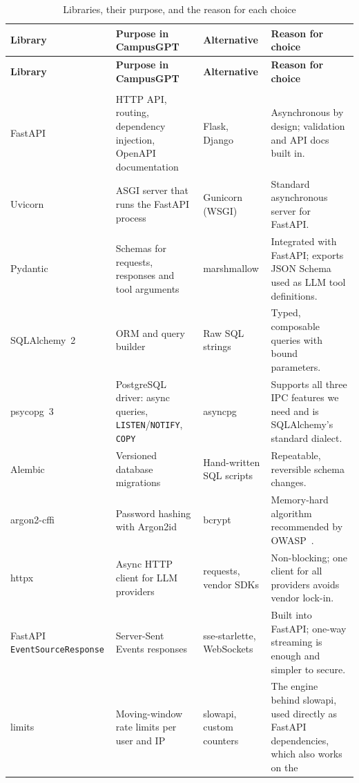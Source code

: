 \documentclass[11pt,a4paper,oneside]{report}
\begin{document}
\begin{longtable}{@{}>{\raggedright\arraybackslash}p{2.9cm}>{\raggedright\arraybackslash}p{4.4cm}>{\raggedright\arraybackslash}p{2.6cm}>{\raggedright\arraybackslash}p{4.5cm}@{}}
\caption{Libraries, their purpose, and the reason for each choice}\label{tab:libs}\\
\toprule
\textbf{Library} & \textbf{Purpose in CampusGPT} & \textbf{Alternative} & \textbf{Reason for
choice}\\
\midrule
\endfirsthead
\toprule
\textbf{Library} & \textbf{Purpose in CampusGPT} & \textbf{Alternative} & \textbf{Reason for
choice}\\
\midrule
\endhead
\bottomrule
\endfoot
\multicolumn{4}{@{}l}{\textit{Backend}}\\
FastAPI~\cite{fastapi} & HTTP API, routing, dependency injection, OpenAPI documentation &
Flask, Django & Asynchronous by design; validation and API docs built in.\\
Uvicorn & ASGI server that runs the FastAPI process & Gunicorn (WSGI) & Standard
asynchronous server for FastAPI.\\
Pydantic~\cite{pydantic} & Schemas for requests, responses and tool arguments &
marshmallow & Integrated with FastAPI; exports JSON Schema used as LLM tool definitions.\\
SQLAlchemy~2 \cite{sqlalchemy} & ORM and query builder & Raw SQL strings & Typed, composable
queries with bound parameters.\\
psycopg~3~\cite{psycopg} & PostgreSQL driver: async queries, \texttt{LISTEN}/\texttt{NOTIFY},
\texttt{COPY} & asyncpg & Supports all three IPC features we need and is SQLAlchemy's
standard dialect.\\
Alembic & Versioned database migrations & Hand-written SQL scripts & Repeatable,
reversible schema changes.\\
argon2-cffi & Password hashing with Argon2id & bcrypt & Memory-hard algorithm recommended
by OWASP~\cite{owasp-passwords}.\\
httpx & Async HTTP client for LLM providers & requests, vendor SDKs & Non-blocking; one
client for all providers avoids vendor lock-in.\\
FastAPI \texttt{EventSourceResponse} & Server-Sent Events responses & sse-starlette,
WebSockets & Built into FastAPI; one-way streaming is enough and simpler to secure.\\
limits & Moving-window rate limits per user and IP & slowapi, custom counters & The
engine behind slowapi, used directly as FastAPI dependencies, which also works on the

\end{longtable}
\end{document}
